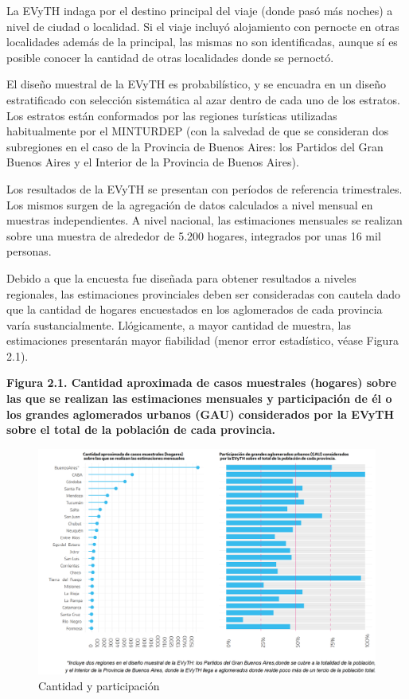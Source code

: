 \documentclass[
]{book}
\begin{document}
La EVyTH indaga por el destino principal del viaje (donde pasó más noches) a nivel de ciudad o localidad.
Si el viaje incluyó alojamiento con pernocte en otras localidades además de la principal, las mismas no son identificadas, aunque sí es posible conocer la cantidad de otras localidades donde se pernoctó.

El diseño muestral de la EVyTH es probabilístico, y se encuadra en un diseño estratificado con selección sistemática al azar dentro de cada uno de los estratos.
Los estratos están conformados por las regiones turísticas utilizadas habitualmente por el MINTURDEP (con la salvedad de que se consideran dos subregiones en el caso de la Provincia de Buenos Aires: los Partidos del Gran Buenos Aires y el Interior de la Provincia de Buenos Aires).

Los resultados de la EVyTH se presentan con períodos de referencia trimestrales.
Los mismos surgen de la agregación de datos calculados a nivel mensual en muestras independientes.
A nivel nacional, las estimaciones mensuales se realizan sobre una muestra de alrededor de 5.200 hogares, integrados por unas 16 mil personas.

Debido a que la encuesta fue diseñada para obtener resultados a niveles regionales, las estimaciones provinciales deben ser consideradas con cautela dado que la cantidad de hogares encuestados en los aglomerados de cada provincia varía sustancialmente.
Llógicamente, a mayor cantidad de muestra, las estimaciones presentarán mayor fiabilidad (menor error estadístico, véase Figura 2.1).

\textbf{Figura 2.1. Cantidad aproximada de casos muestrales (hogares) sobre las que se realizan las estimaciones mensuales y participación de él o los grandes aglomerados urbanos (GAU) considerados por la EVyTH sobre el total de la población de cada provincia.}

\begin{figure}

{\centering \includegraphics[width=0.8\linewidth]{imagenes/figura2.1} 

}

\caption{Cantidad y participación}\label{fig:cantidades}
\end{figure}
\end{document}
